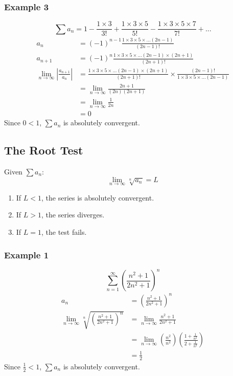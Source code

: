 \documentclass[letterpaper, 12pt]{article}
\begin{document}
\subsubsection*{Example 3}
\[ \sum{a_{n}} = 1-\frac{1\times 3}{3!}+\frac{1\times 3\times 5}{5!}-
   \frac{1\times 3\times 5\times 7}{7!}+... \]
\begin{align*}
  a_{n} &= (-1)^{n-1}\frac{1\times 3\times 5\times...(2n-1)}{(2n-1)!} \\
  a_{n+1} &= (-1)^{n}\frac{1\times 3\times 5\times...(2n-1)\times(2n+1)}
    {(2n+1)!} \\
  \lim_{n\to\infty}|\frac{a_{n+1}}{a_{n}}| &=
    \frac{1\times 3\times 5\times...(2n-1)\times(2n+1)}{(2n+1)!}\times
    \frac{(2n-1)!}{1\times 3\times 5\times...(2n-1)} \\
  &= \lim_{n\to\infty}\frac{2n+1}{(2n)(2n+1)} \\
  &= \lim_{n\to\infty}\frac{1}{2n} \\
  &= 0
\end{align*}
Since \( 0 < 1 \), \( \sum{a_{n}} \) is absolutely convergent.

\subsection*{The Root Test}
Given \( \sum{a_{n}} \):
\[ \lim_{n\to\infty}\sqrt[n]{a_{n}} = L \]
\begin{enumerate}
  \item If \( L < 1 \), the series is absolutely convergent.
  \item If \( L > 1 \), the series diverges.
  \item If \( L = 1 \), the test fails.
\end{enumerate}

\subsubsection*{Example 1}
\[ \sum_{n=1}^{\infty}(\frac{n^{2}+1}{2n^{2}+1})^{n} \]
\begin{align*}
  a_{n} &= (\frac{n^{2}+1}{2n^{2}+1})^{n} \\
  \lim_{n\to\infty}\sqrt[n]{(\frac{n^{2}+1}{2n^{2}+1})^{n}} &=
    \lim_{n\to\infty}\frac{n^{2}+1}{2n^{2}+1} \\
  &= \lim_{n\to\infty}
    (\frac{n^{2}}{n^{2}})(\frac{1+\frac{1}{n^{2}}}{2+\frac{1}{n^{2}}}) \\
  &= \frac{1}{2}
\end{align*}
Since \( \frac{1}{2} < 1 \), \( \sum{a_{n}} \) is absolutely convergent.
\end{document}
